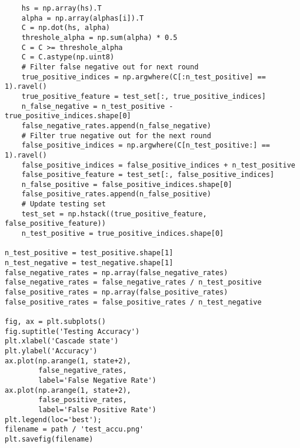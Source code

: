 \documentclass[11pt]{article}
\begin{document}
\begin{lstlisting}
    hs = np.array(hs).T
    alpha = np.array(alphas[i]).T
    C = np.dot(hs, alpha)
    threshole_alpha = np.sum(alpha) * 0.5
    C = C >= threshole_alpha
    C = C.astype(np.uint8)
    # Filter false negative out for next round
    true_positive_indices = np.argwhere(C[:n_test_positive] == 1).ravel()
    true_positive_feature = test_set[:, true_positive_indices]
    n_false_negative = n_test_positive - true_positive_indices.shape[0]
    false_negative_rates.append(n_false_negative)
    # Filter true negative out for the next round
    false_positive_indices = np.argwhere(C[n_test_positive:] == 1).ravel()
    false_positive_indices = false_positive_indices + n_test_positive
    false_positive_feature = test_set[:, false_positive_indices]
    n_false_positive = false_positive_indices.shape[0]
    false_positive_rates.append(n_false_positive)
    # Update testing set
    test_set = np.hstack((true_positive_feature, false_positive_feature))
    n_test_positive = true_positive_indices.shape[0]

n_test_positive = test_positive.shape[1]
n_test_negative = test_negative.shape[1]
false_negative_rates = np.array(false_negative_rates)
false_negative_rates = false_negative_rates / n_test_positive
false_positive_rates = np.array(false_positive_rates)
false_positive_rates = false_positive_rates / n_test_negative

fig, ax = plt.subplots()
fig.suptitle('Testing Accuracy')
plt.xlabel('Cascade state')
plt.ylabel('Accuracy')
ax.plot(np.arange(1, state+2), 
        false_negative_rates, 
        label='False Negative Rate')
ax.plot(np.arange(1, state+2), 
        false_positive_rates, 
        label='False Positive Rate')
plt.legend(loc='best');
filename = path / 'test_accu.png'
plt.savefig(filename)
\end{lstlisting}

\end{document}
